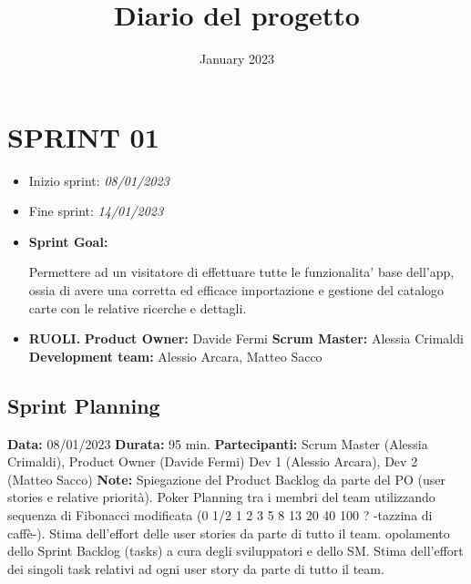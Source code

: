 \documentclass{article}
\title{Diario del progetto}
\date{January 2023}
\begin{document}
    \maketitle


    \section{SPRINT 01}

    \begin{itemize}
        \item Inizio sprint: \textit{08/01/2023}
        \item Fine sprint: \textit{14/01/2023}
    \end{itemize}

    \begin{itemize}
        \item \textbf{Sprint Goal:}
        \begin{indent}
            \newline Permettere ad un visitatore di effettuare tutte le funzionalita' base dell'app, ossia di avere una corretta ed efficace importazione e gestione del catalogo carte con le relative ricerche e dettagli.
        \end{indent}
    \end{itemize}

    \begin{itemize}
        \item \textbf{RUOLI.}
        \newline \textbf{Product Owner:} Davide Fermi
        \newline \textbf{Scrum Master:} Alessia Crimaldi
        \newline \textbf{Development team:} Alessio Arcara, Matteo Sacco
    \end{itemize}

    \subsection{Sprint Planning}
    \item \textbf{Data:} 08/01/2023
    \newline \textbf{Durata:} 95 min.
    \newline \textbf{Partecipanti:} Scrum Master (Alessia Crimaldi), Product Owner (Davide Fermi) Dev 1 (Alessio Arcara), Dev 2 (Matteo Sacco)
    \newline \textbf{Note:} Spiegazione del Product Backlog da parte del PO (user stories e relative priorità). Poker Planning tra i membri del team utilizzando sequenza di Fibonacci modificata (0 1/2 1 2 3 5 8 13 20 40 100 ?  -tazzina di caffè-). Stima dell'effort delle user stories da parte di tutto il team. opolamento dello Sprint Backlog (tasks) a cura degli sviluppatori e dello SM. Stima dell'effort dei singoli task relativi ad ogni user story da parte di tutto il team.
\end{document}
